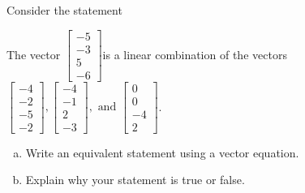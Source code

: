 
\begin{exerciseStatement}


Consider the statement 
\begin{center}\begin{minipage}{0.8\textwidth}
 The vector \( \left[\begin{array}{c}
-5 \\
-3 \\
5 \\
-6
\end{array}\right] \)is a linear combination of the vectors \( \left[\begin{array}{c}
-4 \\
-2 \\
-5 \\
-2
\end{array}\right] , \left[\begin{array}{c}
-4 \\
-1 \\
2 \\
-3
\end{array}\right] , \text{ and } \left[\begin{array}{c}
0 \\
0 \\
-4 \\
2
\end{array}\right] \). 
\end{minipage}\end{center}
    


\begin{enumerate}[(a)]
\item  Write an equivalent statement using a vector equation.
\item  Explain why your statement is true or false.
\end{enumerate}
    
\end{exerciseStatement}
    
